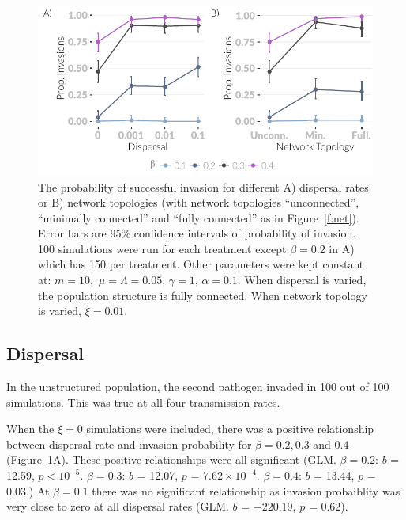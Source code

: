 \begin{knitrout}\footnotesize
{}\color{fgcolor}\begin{figure}[t]

{\centering \includegraphics[width=\textwidth]{figure/invasionPropPlots-1} 

}

\caption[The probability of invasion across different dispersal rates and network topologies.]{
  The probability of successful invasion for different A) dispersal rates or B) network topologies (with network topologies ``unconnected'', ``minimally connected'' and ``fully connected'' as in Figure~\ref{f:net}). 
  Error bars are 95\% confidence intervals of probability of invasion. 
  100 simulations were run for each treatment except $\beta = 0.2$ in A) which has 150 per treatment.
  Other parameters were kept constant at: $m = 10,\, \, \mu = \Lambda = 0.05,\, \gamma = 1,\, \alpha = 0.1$. 
  When dispersal is varied, the population structure is fully connected. 
  When network topology is varied, $\xi = 0.01$.}\label{f:invasionPropPlots}
\end{figure}


\end{knitrout}


\subsection{Dispersal}

In the unstructured population, the second pathogen invaded in 100 out of 100 simulations.
This was true at all four transmission rates.

When the $\xi = 0$ simulations were included, there was a positive relationship between dispersal rate and invasion probability for $\beta = 0.2, 0.3$ and $0.4$ (Figure~\ref{f:invasionPropPlots}A).
These positive relationships were all significant (GLM. $\beta = 0.2$: $b$ = 12.59, $p < 10^{-5}$. $\beta = 0.3$: $b$ = 12.07, $p$ = \ensuremath{7.62\times 10^{-4}}. $\beta = 0.4$: $b$ = 13.44, $p$ = 0.03.)
At $\beta = 0.1$ there was no significant relationship as invasion probaiblity was very close to zero at all dispersal rates (GLM. $b$ = \ensuremath{-220.19}, $p$ = 0.62).

